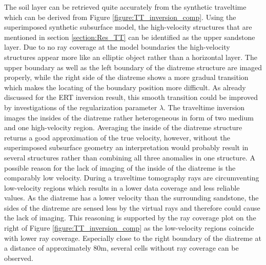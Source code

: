 The soil layer can be retrieved quite accurately from the synthetic traveltime which can be derived from Figure \ref{figure:TT_inversion_comp}. Using the superimposed synthetic subsurface model, the high-velocity structures that are mentioned in section \ref{section:Res_TT} can be identified as the upper sandstone layer. Due to no ray coverage at the model boundaries the high-velocity structures appear more like an elliptic object rather than a horizontal layer. The upper boundary as well as the left boundary of the diatreme structure are imaged properly, while the right side of the diatreme shows a more gradual transition which makes the locating of the boundary position more difficult. As already discussed for the ERT inversion result, this smooth transition could be improved by investigations of the regularization parameter $\lambda$. The traveltime inversion images the insides of the diatreme rather heterogeneous in form of two medium and one high-velocity region. Averaging the inside of the diatreme structure returns a good approximation of the true velocity, however, without the superimposed subsurface geometry an interpretation would probably result in several structures rather than combining all three anomalies in one structure. A possible reason for the lack of imaging of the inside of the diatreme is the comparably low velocity. During a traveltime tomography rays are  circumventing low-velocity regions which results in a lower data coverage and less reliable values. As the diatreme has a lower velocity than the surrounding sandstone, the sides of the diatreme are sensed less by the virtual rays and therefore could cause the lack of imaging. This reasoning is supported by the ray coverage plot on the right of Figure \ref{figure:TT_inversion_comp} as the low-velocity regions coincide with lower ray coverage. Especially close to the right boundary of the diatreme at a distance of approximately 80m, several cells without ray coverage can be observed. 

